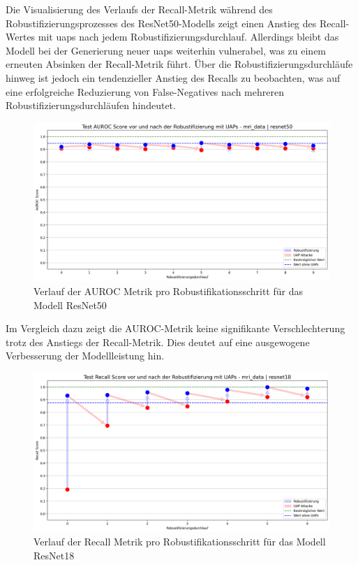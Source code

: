 Die Visualisierung des Verlaufs der Recall-Metrik während des Robustifizierungsprozesses des ResNet50-Modells zeigt einen Anstieg des Recall-Wertes mit \acrshort{uap}s nach jedem Robustifizierungsdurchlauf. Allerdings bleibt das Modell bei der Generierung neuer \acrshort{uap}s weiterhin vulnerabel, was zu einem erneuten Absinken der Recall-Metrik führt. Über die Robustifizierungsdurchläufe hinweg ist jedoch ein tendenzieller Anstieg des Recalls zu beobachten, was auf eine erfolgreiche Reduzierung von False-Negatives nach mehreren Robustifizierungsdurchläufen hindeutet.

\begin{figure}[H]
    \centering
    \includegraphics[width=\linewidth]{01-images/05-resultate/AUROCRobustification_MRI_ResNet50.png}
    \caption{Verlauf der AUROC Metrik pro Robustifikationsschritt für das Modell ResNet50}
    \label{fig:AUROCRobustification MRI ResNet50}
\end{figure}

Im Vergleich dazu zeigt die AUROC-Metrik keine signifikante Verschlechterung trotz des Anstiegs der Recall-Metrik. Dies deutet auf eine ausgewogene Verbesserung der Modellleistung hin.

\begin{figure}[H]
    \centering
    \includegraphics[width=\linewidth]{01-images/05-resultate/RecallRobustification_MRI_ResNet18.png}
    \caption{Verlauf der Recall Metrik pro Robustifikationsschritt für das Modell ResNet18}
    \label{fig:RecallRobustification MRI ResNet18}
\end{figure}

